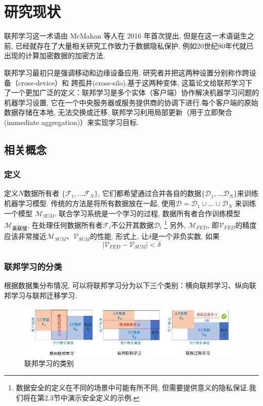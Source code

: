 \documentclass[a4paper]{article}
\theoremstyle{definition}
\numberwithin{equation}{section}
\begin{document}
\section{研究现状} 
联邦学习这一术语由 McMahan 等人在 2016 年首次提出, 但是在这一术语诞生之前, 已经就存在了大量相关研究工作致力于数据隐私保护, 例如20世纪80年代就已出现的计算加密数据的加密方法.

联邦学习最初只是强调移动和边缘设备应用, 研究者并把这两种设置分别称作跨设备（cross-device）和 跨孤井(cross-silo).基于这两种变体, 这篇论文给联邦学习下了一个更加广泛的定义：联邦学习是多个实体（客户端）协作解决机器学习问题的机器学习设置, 它在一个中央服务器或服务提供商的协调下进行.每个客户端的原始数据存储在本地, 无法交换或迁移, 联邦学习利用局部更新（用于立即聚合 (immediate aggregation)）来实现学习目标.

\subsection{相关概念}

\subsubsection{定义}

 
定义$N$数据所有者 $\{\mathcal{F}_1, ...\mathcal{F}_N\}$, 它们都希望通过合并各自的数据$\{\mathcal{D}_1, ...\mathcal{D}_N\}$来训练机器学习模型.
传统的方法是将所有数据放在一起, 使用$\mathcal{D} = \mathcal{D}_1 \cup ...\cup\mathcal{D}_N$ 来训练一个模型 $\mathcal{M}_{SUM}$.
联合学习系统是一个学习的过程, 数据所有者合作训练模型$\mathcal {M} _{美联储}$, 在处理任何数据所有者$ \mathcal {F} _i$不公开其数据$\mathcal {D} _i$  \footnote{数据安全的定义在不同的场景中可能有所不同, 但需要提供意义的隐私保证.我们将在第2.3节中演示安全定义的示例.}
另外, $\mathcal{M}_{FED}$, 即$\mathcal{V}_{FED}$的精度应该非常接近$\mathcal{M}_{SUM}$、$\mathcal{V}_{SUM}$的性能.
形式上, 让$\delta$是一个非负实数, 如果
\begin{equation}\label{define}
 \mid \mathcal{V}_{FED} - \mathcal{V}_{SUM} \mid < \delta
\end{equation}


\subsubsection{联邦学习的分类} 
根据数据集分布情况, 可以将联邦学习分为以下三个类别：横向联邦学习、纵向联邦学习与联邦迁移学习.
\begin{figure}
    \centering
    \includegraphics[width=\textwidth]{Categorization_of_FL.jpg}
    \caption{联邦学习的类别}
\end{figure}
\end{document}

